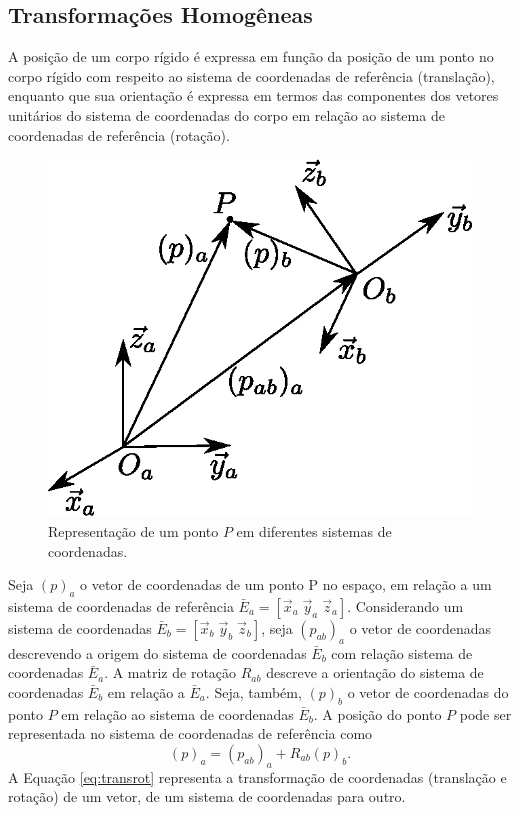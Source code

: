 \subsection{Transformações Homogêneas}
A posição de um corpo rígido é expressa em função da posição de um ponto no corpo rígido com respeito ao sistema de coordenadas de referência (translação),
 enquanto que sua orientação é expressa em termos das componentes dos vetores unitários do sistema de coordenadas do corpo em relação ao sistema de coordenadas de referência (rotação).


\begin{figure}[!h]
  \centering
  \includegraphics[width=0.4\linewidth]{./img/homogeneous_transform}
  \caption{Representação de um ponto $P$ em diferentes sistemas de coordenadas.}
  \label{fig:homogeneous_transform}
\end{figure}


Seja $(p)_a$ o vetor de coordenadas de um ponto P no espaço, em relação a um sistema de coordenadas de referência $\bar{E}_a = [\vec{x}_a \; \vec{y}_a \; \vec{z}_a ]$. 
Considerando um sistema de coordenadas  $\bar{E}_b = [\vec{x}_b \; \vec{y}_b \; \vec{z}_b]$, seja $(p_{ab})_a$ o vetor de coordenadas descrevendo a origem do sistema de coordenadas $\bar{E}_b$ com relação sistema de coordenadas  $\bar{E}_a$. A matriz de rotação $R_{ab}$ descreve a orientação do sistema de coordenadas $\bar{E}_b$ em relação a $\bar{E}_a$. Seja, também, $(p)_b$ o vetor de coordenadas do ponto $P$ em relação ao sistema de coordenadas $\bar{E}_b$.  A posição do ponto $P$ pode ser representada no sistema de coordenadas de referência como
\begin{equation} \label{eq:transrot}
(p)_a = (p_{ab})_a + R_{ab} (p)_b.
\end{equation}
A Equação \eqref{eq:transrot} representa a transformação de coordenadas (translação e rotação) de um vetor, de um sistema de coordenadas para outro.

